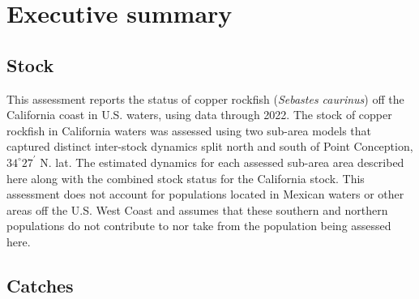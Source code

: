 \documentclass[11pt,
  letterpaper,
]{article}
\begin{document}
\pagestyle{plain}  %
\renewcommand*{\thefootnote}{\arabic{footnote}}  %
\setcounter{footnote}{0}  %
\renewcommand{\headrulewidth}{0.5pt}
\renewcommand{\footrulewidth}{0.5pt}

\newcommand{\lt}{\ensuremath <}
\newcommand{\gt}{\ensuremath >}

\newcommand\CapeM{$40^\circ 10^\prime$ N. lat.}
\newcommand\PtC{$34^\circ 27^\prime$ N. lat.}
\newcommand\CAOR{$42^\circ 00^\prime$ N. lat.}

\section*{Executive summary}\label{executive-summary}

\subsection*{Stock}\label{stock}

This assessment reports the status of copper rockfish (\emph{Sebastes caurinus}) off the California coast in U.S. waters, using data through 2022. The stock of copper rockfish in California waters was assessed using two sub-area models that captured distinct inter-stock dynamics split north and south of Point Conception, $34^\circ 27^\prime$ N. lat. The estimated dynamics for each assessed sub-area area described here along with the combined stock status for the California stock. This assessment does not account for populations located in Mexican waters or other areas off the U.S. West Coast and assumes that these southern and northern populations do not contribute to nor take from the population being assessed here.

\subsection*{Catches}\label{catches}
\end{document}
